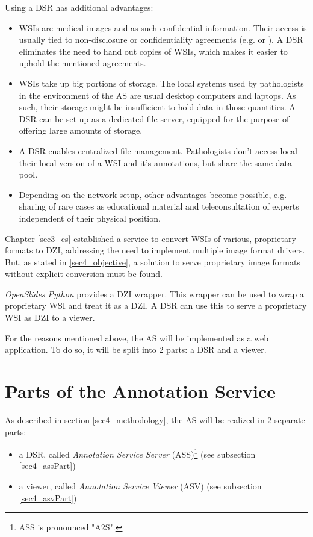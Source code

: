 Using a DSR has additional advantages: 
\begin{itemize}
	\item WSIs are medical images and as such confidential information. Their access is usually tied to non-disclosure or confidentiality agreements (e.g. \cite{COA} or \cite{USSanDiego}). A DSR eliminates the need to hand out copies of WSIs, which makes it easier to uphold the mentioned agreements.
	\item WSIs take up big portions of storage\cite{Singh11}. The local systems used by pathologists in the environment of the AS are usual desktop computers and laptops. As such, their storage might be insufficient to hold data in those quantities. A DSR can be set up as a dedicated file server, equipped for the purpose of offering large amounts of storage.
	\item A DSR enables centralized file management. Pathologists don't access local their local version of a WSI and it's annotations, but share the same data pool.
	\item Depending on the network setup, other advantages become possible, e.g. sharing of rare cases as educational material and teleconsultation of experts independent of their physical position\cite{Wilbur09}.
\end{itemize}

Chapter \ref{sec3_cs} established a service to convert WSIs of various, proprietary formats to DZI, addressing the need to implement multiple image format drivers. But, as stated in \ref{sec4_objective}, a solution to serve proprietary image formats without explicit conversion must be found.

\emph{OpenSlides Python} provides a DZI wrapper. This wrapper can be used to wrap a proprietary WSI and treat it as a DZI\cite{web:openslide}. A DSR can use this to serve a proprietary WSI as DZI to a viewer.

For the reasons mentioned above, the AS will be implemented as a web application. To do so, it will be split into 2 parts: a DSR and a viewer.


\section{Parts of the Annotation Service}
\label{sec4_parts}
As described in section \ref{sec4_methodology}, the AS will be realized in 2 separate parts:
\begin{itemize}
	\item a DSR, called \emph{Annotation Service Server} (ASS)\footnote{
		ASS is pronounced "A2S".
	} (see subsection \ref{sec4_assPart})
	\item a viewer, called \emph{Annotation Service Viewer} (ASV) (see subsection \ref{sec4_asvPart})
\end{itemize}

